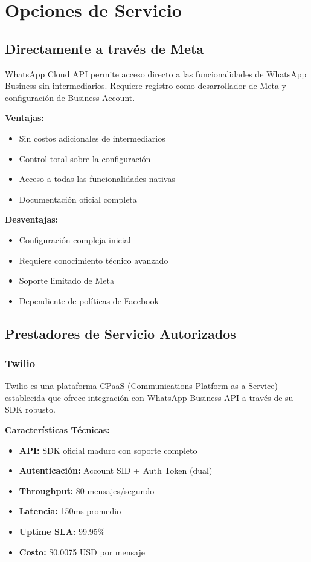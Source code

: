 \documentclass{article}
\begin{document}
\section{Opciones de Servicio}

\subsection{Directamente a través de Meta}
\textnormal{WhatsApp Cloud API permite acceso directo a las funcionalidades de WhatsApp Business sin intermediarios. Requiere registro como desarrollador de Meta y configuración de Business Account.}

\textbf{Ventajas:}
\begin{itemize}[label=\textcolor{successgreen}{$\checkmark$}]
    \item Sin costos adicionales de intermediarios
    \item Control total sobre la configuración
    \item Acceso a todas las funcionalidades nativas
    \item Documentación oficial completa
\end{itemize}

\textbf{Desventajas:}
\begin{itemize}[label=\textcolor{errorred}{$\times$}]
    \item Configuración compleja inicial
    \item Requiere conocimiento técnico avanzado
    \item Soporte limitado de Meta
    \item Dependiente de políticas de Facebook
\end{itemize}

\subsection{Prestadores de Servicio Autorizados}

\subsubsection{Twilio}
\textnormal{Twilio es una plataforma CPaaS (Communications Platform as a Service) establecida que ofrece integración con WhatsApp Business API a través de su SDK robusto.}

\textbf{Características Técnicas:}
\begin{itemize}
    \item \textbf{API:} SDK oficial maduro con soporte completo
    \item \textbf{Autenticación:} Account SID + Auth Token (dual)
    \item \textbf{Throughput:} 80 mensajes/segundo
    \item \textbf{Latencia:} 150ms promedio
    \item \textbf{Uptime SLA:} 99.95\%
    \item \textbf{Costo:} \$0.0075 USD por mensaje
\end{itemize}
\end{document}
